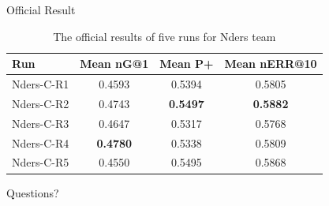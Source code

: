 \documentclass{beamer}
\begin{document}
  \begin{frame}{Official Result}
    \begin{table}
\centering
\caption{The official results of five runs for Nders team}
\label{tab:commands}
\begin{minipage}{\columnwidth}
\begin{center}
\begin{tabular}{|l|c|c|c|}
\hline
 Run        &  Mean nG@1  &  Mean P+  &  Mean nERR@10  \\ \hline
 Nders-C-R1 & 0.4593 & 0.5394 & 0.5805 \\ \hline
 Nders-C-R2 & 0.4743 & \textbf{0.5497} & \textbf{0.5882} \\ \hline
 Nders-C-R3 & 0.4647 & 0.5317 & 0.5768 \\ \hline
 Nders-C-R4 & \textbf{0.4780} & 0.5338 & 0.5809 \\ \hline
 Nders-C-R5 & 0.4550 & 0.5495 & 0.5868 \\ \hline
\end{tabular}
\end{center}
\end{minipage}
\end{table}
  \end{frame}

  \begin{frame}[standout]
    Questions?
  \end{frame}
\end{document}
